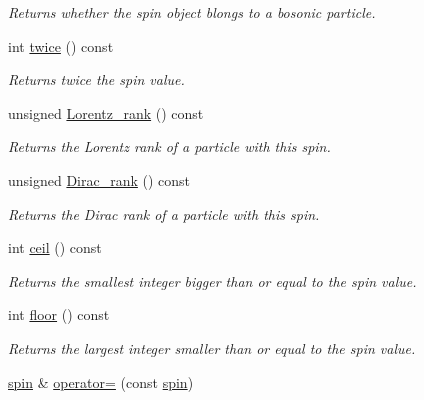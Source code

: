 \begin{DoxyCompactItemize}
\begin{DoxyCompactList}\small\item\em Returns whether the spin object blongs to a bosonic particle. \end{DoxyCompactList}\item 
\hypertarget{a00514_a399fd3032b2c9c980f9080203dab2057}{}int \hyperlink{a00514_a399fd3032b2c9c980f9080203dab2057}{twice} () const \label{a00514_a399fd3032b2c9c980f9080203dab2057}

\begin{DoxyCompactList}\small\item\em Returns twice the spin value. \end{DoxyCompactList}\item 
\hypertarget{a00514_a72c78776eabc7b9bf895219717450b7a}{}unsigned \hyperlink{a00514_a72c78776eabc7b9bf895219717450b7a}{Lorentz\+\_\+rank} () const \label{a00514_a72c78776eabc7b9bf895219717450b7a}

\begin{DoxyCompactList}\small\item\em Returns the Lorentz rank of a particle with this spin. \end{DoxyCompactList}\item 
\hypertarget{a00514_a18e7b1c5f0fba2eb29ecee7bad08bab3}{}unsigned \hyperlink{a00514_a18e7b1c5f0fba2eb29ecee7bad08bab3}{Dirac\+\_\+rank} () const \label{a00514_a18e7b1c5f0fba2eb29ecee7bad08bab3}

\begin{DoxyCompactList}\small\item\em Returns the Dirac rank of a particle with this spin. \end{DoxyCompactList}\item 
\hypertarget{a00514_acc34f6693dc9862b43e0aaef5a9b8ec1}{}int \hyperlink{a00514_acc34f6693dc9862b43e0aaef5a9b8ec1}{ceil} () const \label{a00514_acc34f6693dc9862b43e0aaef5a9b8ec1}

\begin{DoxyCompactList}\small\item\em Returns the smallest integer bigger than or equal to the spin value. \end{DoxyCompactList}\item 
\hypertarget{a00514_a01950bfd7d5d48ec3d4bbfdc358cea72}{}int \hyperlink{a00514_a01950bfd7d5d48ec3d4bbfdc358cea72}{floor} () const \label{a00514_a01950bfd7d5d48ec3d4bbfdc358cea72}

\begin{DoxyCompactList}\small\item\em Returns the largest integer smaller than or equal to the spin value. \end{DoxyCompactList}\item 
\hypertarget{a00514_aeaf26210a7057e30ca81afb21359538a}{}\hyperlink{a00514}{spin} \& \hyperlink{a00514_aeaf26210a7057e30ca81afb21359538a}{operator=} (const \hyperlink{a00514}{spin})\label{a00514_aeaf26210a7057e30ca81afb21359538a}


\end{DoxyCompactItemize}
